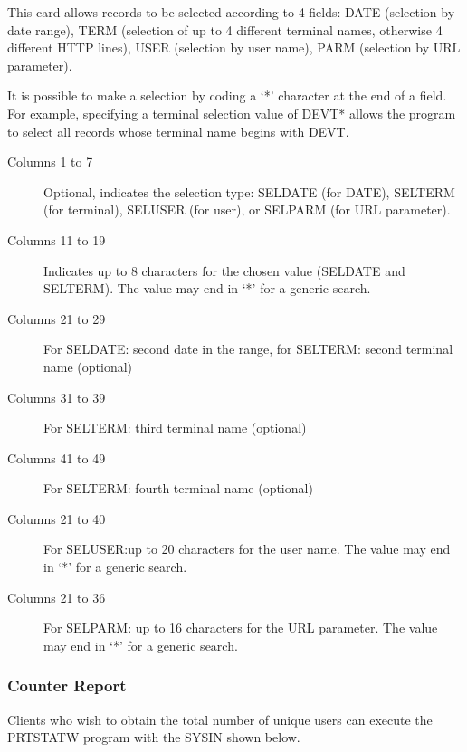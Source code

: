 \documentclass[letterpaper,10pt,english]{sphinxmanual}
\begin{document}

This card allows records to be selected according to 4 fields: DATE (selection by date range), TERM (selection of up to 4 different terminal names, otherwise 4 different HTTP lines), USER (selection by user name), PARM (selection by URL parameter).

It is possible to make a  selection by coding a ‘*’ character at the end of a field. For example, specifying a terminal selection value of DEVT* allows the program to select all records whose terminal name begins with DEVT.
\begin{description}
\item[{Columns 1 to 7}] \leavevmode
Optional, indicates the selection type: SELDATE (for DATE), SELTERM (for terminal), SELUSER (for user), or SELPARM (for URL parameter).

\item[{Columns 11 to 19}] \leavevmode
Indicates up to 8 characters for the chosen value (SELDATE and SELTERM). The value may end in ‘*’ for a generic search.

\item[{Columns 21 to 29}] \leavevmode
For SELDATE: second date in the range, for SELTERM: second terminal name (optional)

\item[{Columns 31 to 39}] \leavevmode
For SELTERM: third terminal name (optional)

\item[{Columns 41 to 49}] \leavevmode
For SELTERM: fourth terminal name (optional)

\item[{Columns 21 to 40}] \leavevmode
For SELUSER:up to 20 characters for the user name. The value may end in ‘*’ for a generic search.

\item[{Columns 21 to 36}] \leavevmode
For SELPARM: up to 16 characters for the URL parameter. The value  may end in ‘*’ for a generic search.

\end{description}


\subsubsection{Counter Report}
\label{\detokenize{audit_operations_ and_performance:counter-report}}
Clients who wish to obtain the total number of unique users can execute the PRTSTATW program with the SYSIN shown below.
\end{document}
